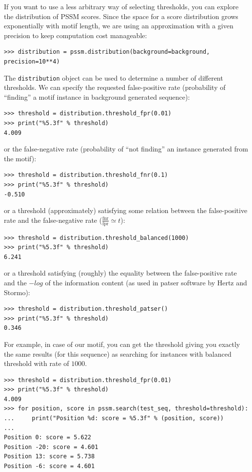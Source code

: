\documentclass{report}
\begin{document}
If you want to use a less arbitrary way of selecting thresholds, you
can explore the distribution of PSSM scores. Since the space for a score
distribution grows exponentially with motif length, we are using an
approximation with a given precision to keep computation cost manageable:
\begin{verbatim}
>>> distribution = pssm.distribution(background=background, precision=10**4)
\end{verbatim}
The \verb+distribution+ object can be used to determine a number of different thresholds.
We can specify the requested false-positive rate (probability of ``finding'' a motif instance in background generated sequence):
\begin{verbatim}
>>> threshold = distribution.threshold_fpr(0.01)
>>> print("%5.3f" % threshold)
4.009
\end{verbatim}
or the false-negative rate (probability of ``not finding'' an instance generated from the motif):
\begin{verbatim}
>>> threshold = distribution.threshold_fnr(0.1)
>>> print("%5.3f" % threshold)
-0.510
\end{verbatim}
or a threshold (approximately) satisfying some relation between the false-positive rate and the false-negative rate ($\frac{\textrm{fnr}}{\textrm{fpr}}\simeq t$):
\begin{verbatim}
>>> threshold = distribution.threshold_balanced(1000)
>>> print("%5.3f" % threshold)
6.241
\end{verbatim}
or a threshold satisfying (roughly) the equality between the
false-positive rate and the $-log$ of the information content (as used
in patser software by Hertz and Stormo):
\begin{verbatim}
>>> threshold = distribution.threshold_patser()
>>> print("%5.3f" % threshold)
0.346
\end{verbatim}

For example, in case of our motif, you can get the threshold giving
you exactly the same results (for this sequence) as searching for
instances with balanced threshold with rate of $1000$.
\begin{verbatim}
>>> threshold = distribution.threshold_fpr(0.01)
>>> print("%5.3f" % threshold)
4.009
>>> for position, score in pssm.search(test_seq, threshold=threshold):
...     print("Position %d: score = %5.3f" % (position, score))
... 
Position 0: score = 5.622
Position -20: score = 4.601
Position 13: score = 5.738
Position -6: score = 4.601
\end{verbatim}
\end{document}
